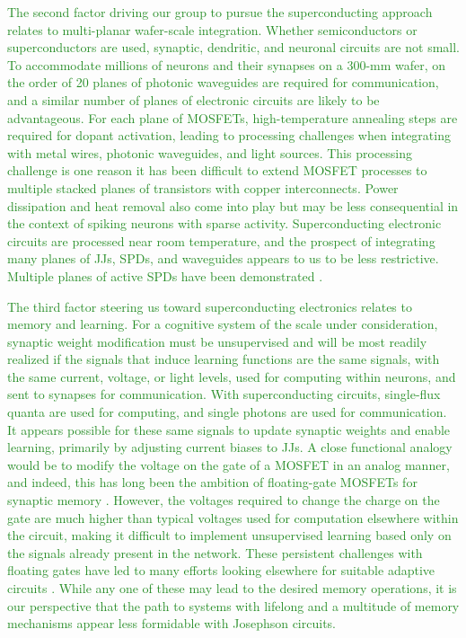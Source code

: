 \documentclass[twocolumn]{article}
\begin{document}
\textcolor{ForestGreen}{The second factor driving our group to pursue the superconducting approach relates to multi-planar wafer-scale integration. Whether semiconductors or superconductors are used, synaptic, dendritic, and neuronal circuits are not small. To accommodate millions of neurons and their synapses on a 300-mm wafer, on the order of 20 planes of photonic waveguides are required for communication, and a similar number of planes of electronic circuits are likely to be advantageous. For each plane of MOSFETs, high-temperature annealing steps are required for dopant activation, leading to processing challenges when integrating with metal wires, photonic waveguides, and light sources. This processing challenge is one reason it has been difficult to extend MOSFET processes to multiple stacked planes of transistors with copper interconnects. Power dissipation and heat removal also come into play but may be less consequential in the context of spiking neurons with sparse activity. Superconducting electronic circuits are processed near room temperature, and the prospect of integrating many planes of JJs, SPDs, and waveguides appears to us to be less restrictive. Multiple planes of active SPDs have been demonstrated \cite{vema2012}.}

\textcolor{ForestGreen}{The third factor steering us toward superconducting electronics relates to memory and learning. For a cognitive system of the scale under consideration, synaptic weight modification must be unsupervised and will be most readily realized if the signals that induce learning functions are the same signals, with the same current, voltage, or light levels, used for computing within neurons, and sent to synapses for communication. With superconducting circuits, single-flux quanta are used for computing, and single photons are used for communication. It appears possible for these same signals to update synaptic weights and enable learning, primarily by adjusting current biases to JJs. A close functional analogy would be to modify the voltage on the gate of a MOSFET in an analog manner, and indeed, this has long been the ambition of floating-gate MOSFETs for synaptic memory \cite{hama2013}. However, the voltages required to change the charge on the gate are much higher than typical voltages used for computation elsewhere within the circuit, making it difficult to implement unsupervised learning based only on the signals already present in the network. These persistent challenges with floating gates have led to many efforts looking elsewhere for suitable adaptive circuits \cite{upji2019}. While any one of these may lead to the desired memory operations, it is our perspective that the path to systems with lifelong and a multitude of memory mechanisms appear less formidable with Josephson circuits.}
\end{document}
